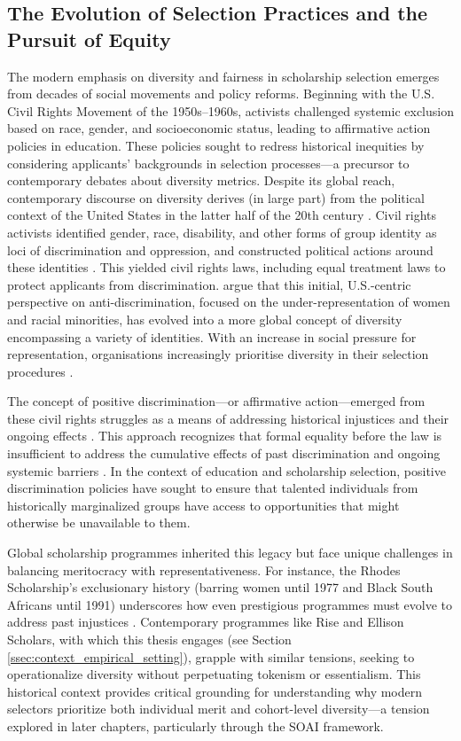 \subsection{The Evolution of Selection Practices and the Pursuit of Equity}\label{ssec:context_evolution_equity}
The modern emphasis on diversity and fairness in scholarship selection emerges from decades of social movements and policy reforms. Beginning with the U.S. Civil Rights Movement of the 1950s–1960s, activists challenged systemic exclusion based on race, gender, and socioeconomic status, leading to affirmative action policies in education. These policies sought to redress historical inequities by considering applicants' backgrounds in selection processes—a precursor to contemporary debates about diversity metrics. Despite its global reach, contemporary discourse on diversity derives (in large part) from the political context of the United States in the latter half of the 20th century \cite{nkomo2019diversity}. Civil rights activists identified gender, race, disability, and other forms of group identity as loci of discrimination and oppression, and constructed political actions around these identities \cite{morris1984origins}. This yielded civil rights laws, including equal treatment laws to protect applicants from discrimination. \textcite{nkomo2019diversity} argue that this initial, U.S.-centric perspective on anti-discrimination, focused on the under-representation of women and racial minorities, has evolved into a more global concept of diversity encompassing a variety of identities. With an increase in social pressure for representation, organisations increasingly prioritise diversity in their selection procedures \cite{hsieh2019allocation,minkin2023diversity}.

The concept of positive discrimination—or affirmative action—emerged from these civil rights struggles as a means of addressing historical injustices and their ongoing effects \cite{anderson2010imperative}. This approach recognizes that formal equality before the law is insufficient to address the cumulative effects of past discrimination and ongoing systemic barriers \cite{young1990justice}. In the context of education and scholarship selection, positive discrimination policies have sought to ensure that talented individuals from historically marginalized groups have access to opportunities that might otherwise be unavailable to them.

Global scholarship programmes inherited this legacy but face unique challenges in balancing meritocracy with representativeness. For instance, the Rhodes Scholarship's exclusionary history (barring women until 1977 and Black South Africans until 1991) underscores how even prestigious programmes must evolve to address past injustices \cite{Ziegler_2008}. Contemporary programmes like Rise and Ellison Scholars, with which this thesis engages (see Section \ref{ssec:context_empirical_setting}), grapple with similar tensions, seeking to operationalize diversity without perpetuating tokenism or essentialism. This historical context provides critical grounding for understanding why modern selectors prioritize both individual merit and cohort-level diversity—a tension explored in later chapters, particularly through the SOAI framework.

